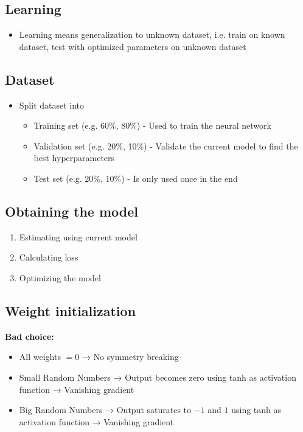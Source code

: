 \documentclass[10pt,a4paper]{article}
\begin{document}
\subsection{Learning}
\begin{itemize}
	\item Learning means generalization to unknown dataset, i.e. train on known dataset, test with optimized parameters on unknown dataset
\end{itemize}

\subsection{Dataset}
\begin{itemize}
	\item Split dataset into
	\begin{itemize}
		\item Training set (e.g. 60\%, 80\%) - Used to train the neural network
		\item Validation set (e.g. 20\%, 10\%) - Validate the current model to find the best hyperparameters
		\item Test set (e.g. 20\%, 10\%) - Is only used once in the end
	\end{itemize}
\end{itemize}

\subsection{Obtaining the model}
\begin{enumerate}
	\item Estimating using current model
	\item Calculating loss
	\item Optimizing the model
\end{enumerate}

\subsection{Weight initialization}
\textbf{Bad choice:}
\begin{itemize}
	\item All weights $= 0$ → No symmetry breaking
	\item Small Random Numbers → Output becomes zero using tanh as activation function → Vanishing gradient
	\item Big Random Numbers → Output saturates to $-1$ and $1$ using tanh as activation function → Vanishing gradient
\end{itemize}
\end{document}
